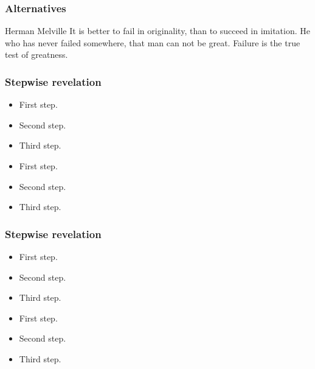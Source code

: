 \documentclass[11pt]{beamer}
\begin{document}
\begin{frame}
  \frametitle{Alternatives}
  \begin{block}{Herman Melville}
    {%
      It is better to fail in originality, than to succeed in
      imitation. %
      He who has never failed somewhere, that man can not be
      great. %
      Failure is the true test of greatness.}
  \end{block}
  
\end{frame}

\begin{frame}
  \frametitle{Stepwise revelation}
  \begin{minipage}{.45\linewidth}
    \begin{itemize}
    \item<1-> First step.
    \item<2-> Second step.
    \item<3-> Third step.
    \end{itemize}
  \end{minipage}
  \begin{minipage}{.45\linewidth}
    \begin{itemize}
    \item<1-> First step.
    \item<2-> Second step.
    \item<3-> Third step.
    \end{itemize}
  \end{minipage}
\end{frame}

\begin{frame}
  \frametitle{Stepwise revelation}
  \begin{minipage}{.45\linewidth}
    \begin{itemize}[<+->]
    \item First step.
    \item Second step.
    \item Third step.
    \end{itemize}
  \end{minipage}
  \begin{minipage}{.45\linewidth}
    \begin{itemize}[<+- | alert@+>]
    \item First step.
    \item Second step.
    \item Third step.
    \end{itemize}
  \end{minipage}
\end{frame}
\end{document}
